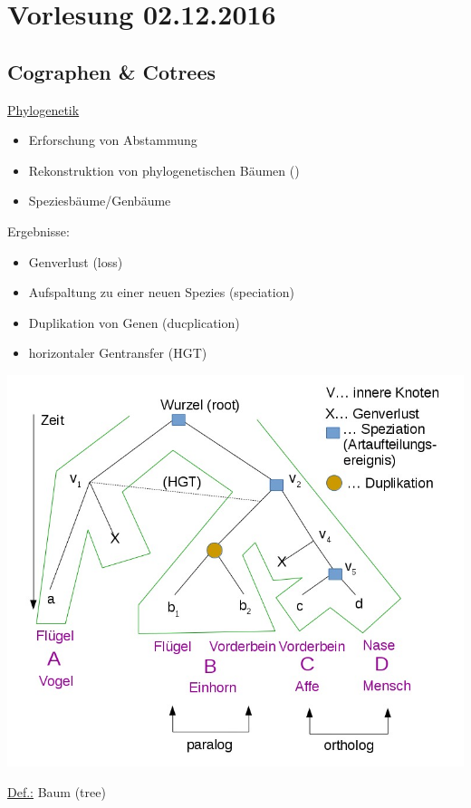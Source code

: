 \section{Vorlesung 02.12.2016}

\subsection{Cographen \& Cotrees}
\underline{Phylogenetik}
\begin{itemize}
    \item Erforschung von Abstammung
    \item Rekonstruktion von phylogenetischen Bäumen (\grqq )
    \item Speziesbäume/Genbäume
\end{itemize}    
Ergebnisse:
\begin{itemize}
    \item Genverlust (loss)
    \item Aufspaltung zu einer neuen Spezies (speciation)
    \item Duplikation von Genen (ducplication)
    \item horizontaler Gentransfer (HGT)
\end{itemize}
\begin{center}
\includegraphics[scale=0.5]{lectures/161202/pix/01.jpg}
\end{center}
\par\medskip
\underline{Def.:} Baum (tree)
\newline
